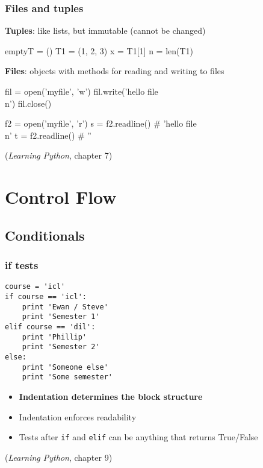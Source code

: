 \begin{frame}
  \frametitle{Files and tuples}
  
  \textbf{Tuples}: like lists, but immutable (cannot be changed)
  \pause
\begin{semiverbatim}\small
emptyT = () \newline
T1 = (1, 2, 3)\newline
x = T1[1]\newline
n = len(T1)
\end{semiverbatim}

  \pause
  \textbf{Files}:  objects with methods for reading and writing to files
    \pause
\begin{semiverbatim}\small
fil = open('myfile', 'w')\newline
fil.write('hello file\\n')\newline
fil.close()\newline
\end{semiverbatim}
\pause
\begin{semiverbatim}\small
f2 = open('myfile', 'r')\newline
s = f2.readline() \# 'hello file\\n'\newline
t = f2.readline() \# ''
\end{semiverbatim}
    (\emph{Learning Python}, chapter 7)    
\end{frame}

\section{Control Flow}

\subsection{Conditionals}
\begin{frame}[fragile]
  \frametitle{if tests}
{\small
\begin{verbatim}
course = 'icl'
if course == 'icl':
    print 'Ewan / Steve'
    print 'Semester 1'
elif course == 'dil':
    print 'Phillip'
    print 'Semester 2'
else:
    print 'Someone else'
    print 'Some semester'
\end{verbatim}}
  \pause
  \begin{itemize}
  \item \textbf{Indentation determines the block structure}
  \item Indentation enforces readability
  \item Tests after \texttt{if} and \texttt{elif} can be anything that
    returns True/False
  \end{itemize}
    (\emph{Learning Python}, chapter 9)    
\end{frame}


